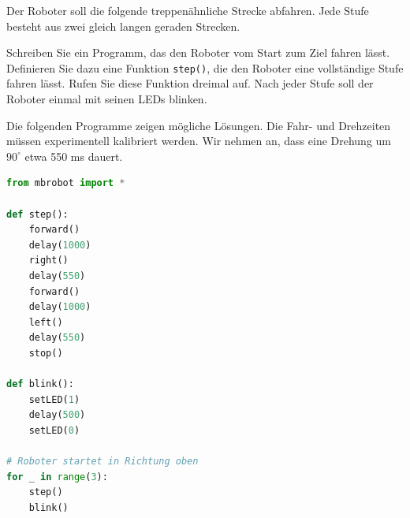 \begin{myexercise}


    Der Roboter soll die folgende treppenähnliche Strecke
    abfahren. Jede Stufe besteht aus zwei gleich langen
    geraden Strecken.

    \begin{center}
    \end{center}

    Schreiben Sie ein Programm, das den Roboter
    vom Start zum Ziel fahren lässt.
    Definieren Sie dazu eine Funktion
    \texttt{step()}, die den Roboter eine
    vollständige Stufe fahren lässt.
    Rufen Sie diese Funktion dreimal auf.
    Nach jeder Stufe soll der Roboter einmal
    mit seinen LEDs blinken.


    \begin{myanswer}
        Die folgenden Programme zeigen mögliche Lösungen.
        Die Fahr- und Drehzeiten müssen experimentell
        kalibriert werden. Wir nehmen an, dass eine
        Drehung um \(90^\circ\) etwa 550 ms dauert.


        \begin{lstlisting}[language=Python]
from mbrobot import *

def step():
    forward()
    delay(1000)
    right()
    delay(550)
    forward()
    delay(1000)
    left()
    delay(550)
    stop()

def blink():
    setLED(1)
    delay(500)
    setLED(0)

# Roboter startet in Richtung oben
for _ in range(3):
    step()
    blink()
        \end{lstlisting}
    \end{myanswer}
\end{myexercise}







































